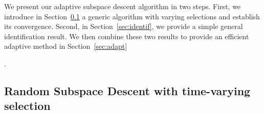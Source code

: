 {%


We present our adaptive subspace descent algorithm in two steps. First, we introduce in Section~\ref{sec:ada_algo} a generic algorithm with varying selections and establish its convergence. %
Second, in Section~\ref{sec:identif}, we provide a simple general identification result. We then combine these two results to provide an efficient adaptive method in Section~\ref{sec:adapt}}. %







\subsection{Random Subspace Descent with time-varying selection}
\label{sec:ada_algo}

